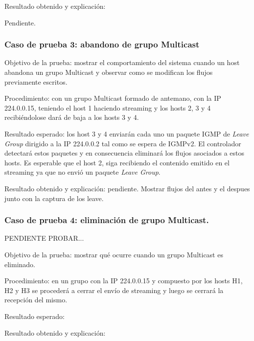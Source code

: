 \documentclass[12pt,a4paper,oneside]{book}
\begin{document}
\vspace{0.5cm}
Resultado obtenido y explicación: 

Pendiente.



\subsubsection{Caso de prueba 3: abandono de grupo Multicast} 

Objetivo de la prueba: mostrar el comportamiento del sistema cuando un host abandona un grupo Multicast y observar como se modifican los flujos previamente escritos.

\vspace{0.5cm}
Procedimiento: con un grupo Multicast formado de antemano, con la IP 224.0.0.15, teniendo el host 1 haciendo streaming y los hosts 2, 3 y 4 recibiéndolose dará de baja a los hosts 3 y 4.

\vspace{0.5cm}
Resultado esperado: los host 3 y 4 enviarán cada uno un paquete IGMP de \textit{Leave Group} dirigido a la IP 224.0.0.2 tal como se espera de IGMPv2. El controlador detectará estos paquetes y en consecuencia eliminará los flujos asociados a estos hosts. Es esperable que el host 2, siga recibiendo el contenido emitido en el streaming ya que no envió un paquete \textit{Leave Group}.

\vspace{0.5cm}
Resultado obtenido y explicación: pendiente. Mostrar flujos del antes y el despues junto con la captura de los leave.

\subsubsection{Caso de prueba 4: eliminación de grupo Multicast.} 

PENDIENTE PROBAR...

Objetivo de la prueba: mostrar qué ocurre cuando un grupo Multicast es eliminado.

\vspace{0.5cm}
Procedimiento: en un grupo con la IP 224.0.0.15 y compuesto por los hosts H1, H2 y H3 se procederá a cerrar el envío de streaming y luego se cerrará la recepción del mismo.

\vspace{0.5cm}
Resultado esperado: 

\vspace{0.5cm}
Resultado obtenido y explicación: 
\end{document}

